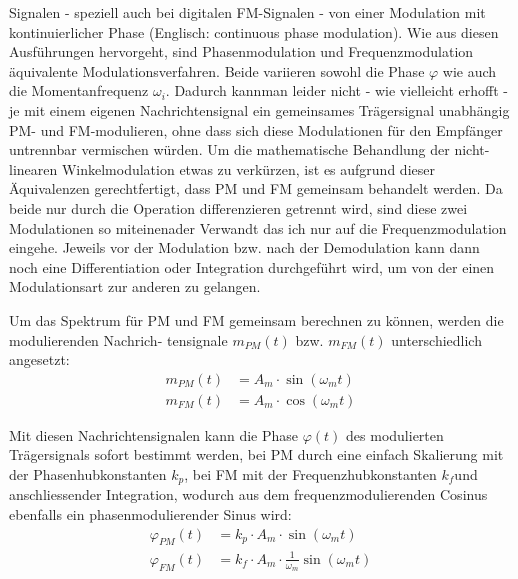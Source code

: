  Signalen - speziell auch bei digitalen FM-Signalen - von einer Modulation mit kontinuierlicher Phase (Englisch: continuous phase modulation).
Wie aus diesen Ausführungen hervorgeht, sind Phasenmodulation und Frequenzmodulation äquivalente Modulationsverfahren.
Beide variieren sowohl die Phase \(\varphi\) wie auch die Momentanfrequenz \(\omega_i.\)
Dadurch kannman leider nicht - wie vielleicht erhofft - je mit einem eigenen Nachrichtensignal ein gemeinsames Trägersignal unabhängig PM- und FM-modulieren,
 ohne dass sich diese Modulationen für den Empfänger untrennbar vermischen würden.
Um die mathematische Behandlung der nicht-linearen Winkelmodulation etwas zu verkürzen, ist es aufgrund dieser Äquivalenzen gerechtfertigt,
dass PM und FM gemeinsam behandelt werden. 
Da beide nur durch die Operation differenzieren getrennt wird, sind diese zwei Modulationen so miteinenader Verwandt das ich nur auf die Frequenzmodulation eingehe.
Jeweils vor der Modulation bzw. nach der Demodulation kann dann noch eine Differentiation oder 
Integration durchgeführt wird, um von der einen Modulationsart zur anderen zu gelangen.
\cite{fm:NAT}

Um das Spektrum für PM und FM gemeinsam berechnen zu können, werden die modulierenden Nachrich-
tensignale \(m_{PM}(t)\) bzw. \(m_{FM}(t)\) unterschiedlich angesetzt:
\begin{align}
    m_{PM}(t)
    &=
    A_m \cdot \sin(\omega_m t)
    \\
    m_{FM}(t) 
    &= 
    A_m \cdot \cos(\omega_m t)
\end{align}

Mit diesen Nachrichtensignalen kann die Phase \(\varphi(t)\) des modulierten Trägersignals sofort bestimmt werden,
bei PM durch eine einfach Skalierung mit der Phasenhubkonstanten \(k_p\), 
bei FM mit der Frequenzhubkonstanten \(k_f\)und anschliessender Integration, 
wodurch aus dem frequenzmodulierenden Cosinus ebenfalls ein phasenmodulierender Sinus wird:
\begin{align}
    \varphi_{PM}(t) &= k_p \cdot A_m \cdot \sin(\omega_m t)
    \\
    \varphi_{FM}(t) &= k_f \cdot A_m \cdot \frac{1}{\omega_m} \sin(\omega_m t)
\end{align}

